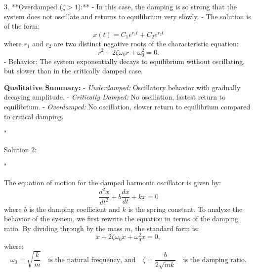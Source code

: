 3. **Overdamped (\( \zeta > 1 \)):**
   - In this case, the damping is so strong that the system does not oscillate and returns to equilibrium very slowly.
   - The solution is of the form:
     \[
     x(t) = C_1 e^{r_1 t} + C_2 e^{r_2 t}
     \]
     where \( r_1 \) and \( r_2 \) are two distinct negative roots of the characteristic equation:
     \[
     r^2 + 2\zeta\omega_0 r + \omega_0^2 = 0.
     \]
   - Behavior: The system exponentially decays to equilibrium without oscillating, but slower than in the critically damped case.

\textbf{Qualitative Summary:}
- \textit{Underdamped:} Oscillatory behavior with gradually decaying amplitude.
- \textit{Critically Damped:} No oscillation, fastest return to equilibrium.
- \textit{Overdamped:} No oscillation, slower return to equilibrium compared to critical damping.

"

Solution 2: 

"

The equation of motion for the damped harmonic oscillator is given by:
\[
\frac{d^2x}{dt^2} + b\frac{dx}{dt} + kx = 0
\]
where \( b \) is the damping coefficient and \( k \) is the spring constant. To analyze the behavior of the system, we first rewrite the equation in terms of the damping ratio. By dividing through by the mass \( m \), the standard form is:
\[
\ddot{x} + 2\zeta \omega_0 \dot{x} + \omega_0^2 x = 0,
\]
where:
\[
\omega_0 = \sqrt{\frac{k}{m}} \quad \text{is the natural frequency, and} \quad \zeta = \frac{b}{2\sqrt{mk}} \quad \text{is the damping ratio.}
\]

